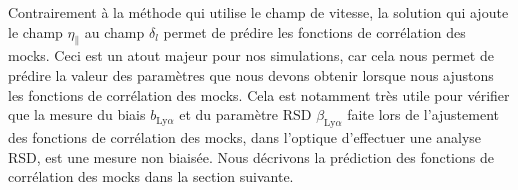 Contrairement à la méthode qui utilise le champ de vitesse, la solution qui ajoute le champ $\eta_{\parallel}$ au champ $\delta_l$ permet de prédire les fonctions de corrélation des mocks.
Ceci est un atout majeur pour nos simulations, car cela nous permet de prédire la valeur des paramètres que nous devons obtenir lorsque nous ajustons les fonctions de corrélation des mocks.
Cela est notamment très utile pour vérifier que la mesure du biais $b_{\mathrm{Ly}\alpha}$ et du paramètre RSD $\beta_{\mathrm{Ly}\alpha}$ faite lors de l'ajustement des fonctions de corrélation des mocks, dans l'optique d'effectuer une analyse RSD, est une mesure non biaisée.
Nous décrivons la prédiction des fonctions de corrélation des mocks dans la section suivante.


